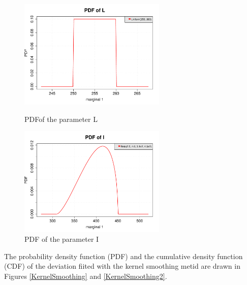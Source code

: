\documentclass[11pt]{article}
\begin{document}
\begin{figure}[Hhbtp]
  \begin{minipage}{9.8cm}
    \begin{center}
      \includegraphics[width=7cm]{Figures/distributionL_pdf.pdf}
      \caption{PDFof the parameter L}
      \label{pdfL}
    \end{center}
  \end{minipage}
  \hfill
  \begin{minipage}{9.8cm}
    \begin{center}
      \includegraphics[width=7cm]{Figures/distributionI_pdf.pdf}
      \caption{PDF of the parameter I}
      \label{pdfI}
    \end{center}
  \end{minipage}
\end{figure}

The probability density function (PDF) and the cumulative density function (CDF) of the deviation fiited with the kernel smoothing metid are drawn in Figures \ref{KernelSmoothing} and  \ref{KernelSmoothing2}.
\end{document}
